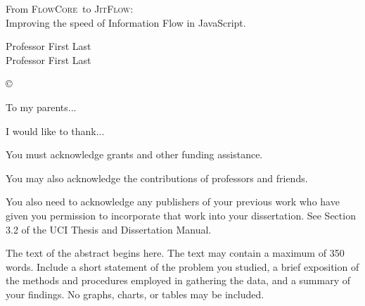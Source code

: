\documentclass[12pt,fleqn]{ucithesis}
\newcommand{\FlowCore}[0]{\textsc{FlowCore}}
\newcommand{\JitFlow}[0]{\textsc{JitFlow}}
\begin{document}
\thesistitle
{
        From \FlowCore\ to \JitFlow:\\
        Improving the speed of Information Flow in JavaScript.
}




\othercommitteemembers
{
	Professor First Last\\
	Professor First Last
}


\copyrightdeclaration
{
	{\copyright} {\Degreeyear} \Authorname
}


\dedications
{
	To my parents...
}

\acknowledgments
{
	I would like to thank...

	You must acknowledge grants and other funding assistance. 

	You may also acknowledge the contributions of professors and friends. 
	
	You also need to acknowledge any publishers of your previous work who have given you permission to incorporate that work into your dissertation. See Section 3.2 of the UCI Thesis and Dissertation Manual.
}



\thesisabstract
{
	The text of the abstract begins here. The text may contain a maximum of 350 words. Include a short statement of the 
problem you studied, a brief exposition of the methods and procedures employed in gathering the data, and a summary of your 
findings. No graphs, charts, or tables may be included.
}
\end{document}
